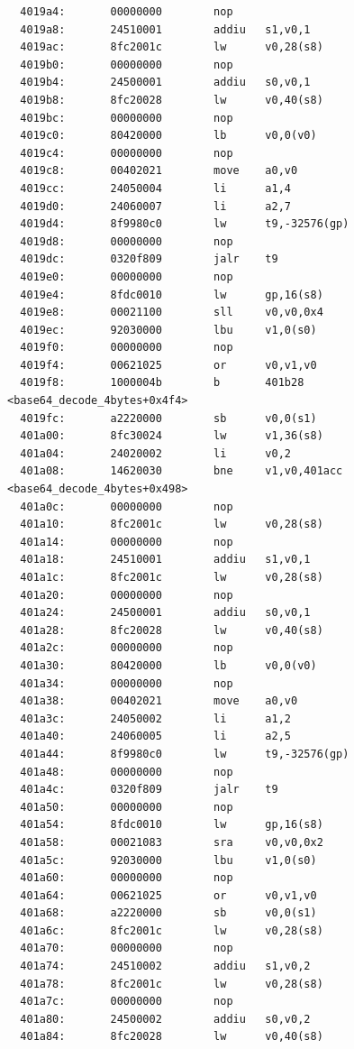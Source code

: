 \documentclass[11pt]{article}
\begin{document}
\begin{verbatim}
  4019a4:       00000000        nop
  4019a8:       24510001        addiu   s1,v0,1
  4019ac:       8fc2001c        lw      v0,28(s8)
  4019b0:       00000000        nop
  4019b4:       24500001        addiu   s0,v0,1
  4019b8:       8fc20028        lw      v0,40(s8)
  4019bc:       00000000        nop
  4019c0:       80420000        lb      v0,0(v0)
  4019c4:       00000000        nop
  4019c8:       00402021        move    a0,v0
  4019cc:       24050004        li      a1,4
  4019d0:       24060007        li      a2,7
  4019d4:       8f9980c0        lw      t9,-32576(gp)
  4019d8:       00000000        nop
  4019dc:       0320f809        jalr    t9
  4019e0:       00000000        nop
  4019e4:       8fdc0010        lw      gp,16(s8)
  4019e8:       00021100        sll     v0,v0,0x4
  4019ec:       92030000        lbu     v1,0(s0)
  4019f0:       00000000        nop
  4019f4:       00621025        or      v0,v1,v0
  4019f8:       1000004b        b       401b28 <base64_decode_4bytes+0x4f4>
  4019fc:       a2220000        sb      v0,0(s1)
  401a00:       8fc30024        lw      v1,36(s8)
  401a04:       24020002        li      v0,2
  401a08:       14620030        bne     v1,v0,401acc <base64_decode_4bytes+0x498>
  401a0c:       00000000        nop
  401a10:       8fc2001c        lw      v0,28(s8)
  401a14:       00000000        nop
  401a18:       24510001        addiu   s1,v0,1
  401a1c:       8fc2001c        lw      v0,28(s8)
  401a20:       00000000        nop
  401a24:       24500001        addiu   s0,v0,1
  401a28:       8fc20028        lw      v0,40(s8)
  401a2c:       00000000        nop
  401a30:       80420000        lb      v0,0(v0)
  401a34:       00000000        nop
  401a38:       00402021        move    a0,v0
  401a3c:       24050002        li      a1,2
  401a40:       24060005        li      a2,5
  401a44:       8f9980c0        lw      t9,-32576(gp)
  401a48:       00000000        nop
  401a4c:       0320f809        jalr    t9
  401a50:       00000000        nop
  401a54:       8fdc0010        lw      gp,16(s8)
  401a58:       00021083        sra     v0,v0,0x2
  401a5c:       92030000        lbu     v1,0(s0)
  401a60:       00000000        nop
  401a64:       00621025        or      v0,v1,v0
  401a68:       a2220000        sb      v0,0(s1)
  401a6c:       8fc2001c        lw      v0,28(s8)
  401a70:       00000000        nop
  401a74:       24510002        addiu   s1,v0,2
  401a78:       8fc2001c        lw      v0,28(s8)
  401a7c:       00000000        nop
  401a80:       24500002        addiu   s0,v0,2
  401a84:       8fc20028        lw      v0,40(s8)

\end{verbatim}
\end{document}
